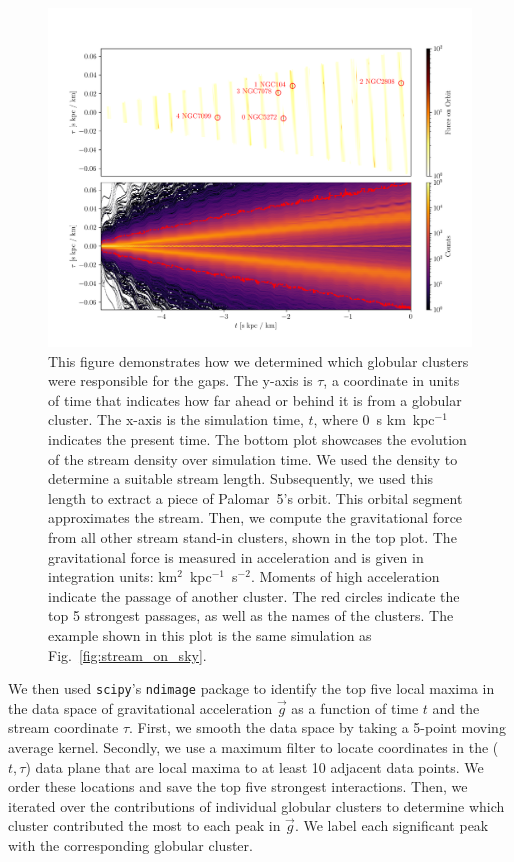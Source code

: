 \documentclass{aa}
\begin{document}
\begin{appendix}
    \begin{figure}
      \centering
      \includegraphics[width=\linewidth]{force_on_orbit-monte-carlo-009.png}
      \caption{This figure demonstrates how we determined which globular clusters were responsible for the gaps. The y-axis is $\tau$, a coordinate in units of time that indicates how far ahead or behind it is from a globular cluster. The x-axis is the simulation time, $t$, where 0~s km~kpc$^{-1}$ indicates the present time. The bottom plot showcases the evolution of the stream density over simulation time. We used the density to determine a suitable stream length. Subsequently, we used this length to extract a piece of Palomar~5's orbit. This orbital segment approximates the stream. Then, we compute the gravitational force from all other stream stand-in clusters, shown in the top plot. The gravitational force is measured in acceleration and is given in integration units: km$^2$~kpc$^{-1}$~s$^{-2}$. Moments of high acceleration indicate the passage of another cluster. The red circles indicate the top 5 strongest passages, as well as the names of the clusters. The example shown in this plot is the same simulation as Fig.~\ref{fig:stream_on_sky}.}
      \label{fig:force-on-orbit}
    \end{figure}  


    We then used \texttt{scipy}'s \texttt{ndimage} \citep{2020NatMe..17..261V} package to identify the top five local maxima in the data space of gravitational acceleration $\vec{g}$ as a function of time $t$ and the stream coordinate $\tau$. First, we smooth the data space by taking a 5-point moving average kernel. Secondly, we use a maximum filter to locate coordinates in the ($t,\tau$) data plane that are local maxima to at least 10 adjacent data points. We order these locations and save the top five strongest interactions. Then, we iterated over the contributions of individual globular clusters to determine which cluster contributed the most to each peak in $\vec{g}$. We label each significant peak with the corresponding globular cluster.



\end{appendix}
\end{document}

